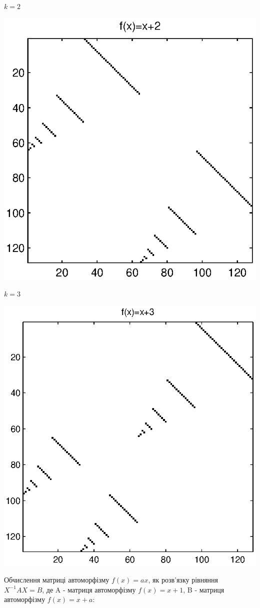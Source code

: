 \documentclass[a4paper,12pt]{article} \usepackage{a4wide}
\numberwithin{equation}{subsection}
\begin{document}
$k=2$
\begin{center}
\includegraphics[scale=0.9]{mat_x+2.eps}
\end{center}
$k=3$
\begin{center}
\includegraphics[scale=0.75]{mat_x+3.eps}
\end{center}
Обчислення матриці автоморфізму $f(x)=ax$, як  розв'язку рівняння $X^{-1}AX=B$, де A - матриця автоморфізму $f(x)=x+1$, B - матриця автоморфізму $f(x)=x+a$:
\end{document}

